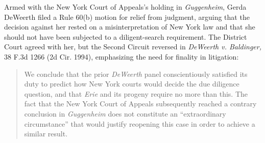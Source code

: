 Armed with the New York Court of Appeals's holding in \textit{Guggenheim}, Gerda
DeWeerth filed a Rule 60(b) motion for relief from judgment, arguing that the
decision against her rested on a misinterpretation of New York law and that she
should not have been subjected to a diligent-search requirement. The District
Court agreed with her, but the Second Circuit reversed in \textit{DeWeerth v.
Baldinger,} 38 F.3d 1266 (2d Cir. 1994), emphasizing the need for finality in
litigation:
\begin{quote}
We conclude that the prior \textit{DeWeerth} panel conscientiously satisfied its
duty to predict how New York courts would decide the due diligence question,
and that \textit{Erie} and its progeny require no more than this. The fact that
the New York Court of Appeals subsequently reached a contrary conclusion in
\textit{Guggenheim} does not constitute an ``extraordinary circumstance'' that
would justify reopening this case in order to achieve a similar result.
\end{quote}

